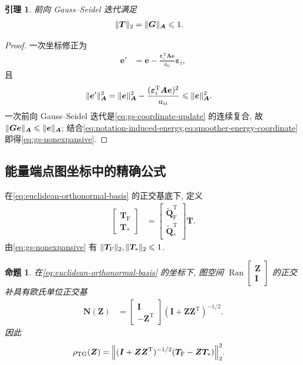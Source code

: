 \documentclass{ctexart}
\newcommand{\T}{\mathrm{T}}
\newcommand{\ti}[1]{\widetilde{#1}}
\newcommand{\eps}{\varepsilon}
\renewcommand{\le}{\leqslant}
\DeclareMathOperator{\Ran}{Ran}
\DeclarePairedDelimiter\norm{\lVert}{\rVert}
\newtheorem{lemma}[theorem]{引理}
\newtheorem{proposition}[theorem]{命题}
\begin{document}
\begin{lemma}
\label{lem:gs-nonexpansive}
前向 Gauss--Seidel 迭代满足
\begin{align}
    \norm{\bm T}_2&=\norm{\bm G}_{\bm A}\le 1.
    \label{eq:gs-nonexpansive}
\end{align}
\end{lemma}

\begin{proof}
一次坐标修正为
\begin{align}
    \bm e'&=\bm e-\frac{\bm\eps_i^\T\bm A\bm e}{a_{ii}}\bm\eps_i,
    \label{eq:gs-coordinate-update}
\end{align}
且
\begin{align}
    \norm{\bm e'}_{\bm A}^2&=\norm{\bm e}_{\bm A}^2-\frac{(\bm\eps_i^\T\bm A\bm e)^2}{a_{ii}}\le\norm{\bm e}_{\bm A}^2.
    \label{eq:gs-coordinate-energy}
\end{align}
一次前向 Gauss--Seidel 迭代是\cref{eq:gs-coordinate-update} 的连续复合, 故 $\norm{\bm G\bm e}_{\bm A}\le\norm{\bm e}_{\bm A}$; 结合\cref{eq:notation-induced-energy,eq:smoother-energy-coordinate} 即得\cref{eq:gs-nonexpansive}.
\end{proof}

\subsection{能量端点图坐标中的精确公式}
\label{subsec:graph-projector-stability}

在\cref{eq:euclidean-orthonormal-basis} 的正交基底下, 定义
\begin{align}
    \begin{bmatrix}
        \bm T_{\mathrm F}\\
        \bm T_\ast
    \end{bmatrix}
    &=\begin{bmatrix}
        \ti{\bm Q}_{\mathrm F}^\T\\
        \ti{\bm Q}_{\ast}^\T
    \end{bmatrix}\bm T.
    \label{eq:T-block-coordinates}
\end{align}
由\cref{eq:gs-nonexpansive} 有 $\norm{\bm T_{\mathrm F}}_2,\norm{\bm T_\ast}_2\le1$.

\begin{proposition}
\label{prop:graph-projector}
在\cref{eq:euclidean-orthonormal-basis} 的坐标下, 图空间 $\Ran\begin{bmatrix}\bm Z\\\bm I\end{bmatrix}$ 的正交补具有欧氏单位正交基
\begin{align}
    \bm N(\bm Z)&=\begin{bmatrix}
        \bm I\\
        -\bm Z^\T
    \end{bmatrix}(\bm I+\bm Z\bm Z^\T)^{-1/2}.
    \label{eq:graph-complement-basis}
\end{align}
因此
\begin{align}
    \rho_{\mathrm{TG}}(\bm Z)&=\norm*{(\bm I+\bm Z\bm Z^\T)^{-1/2}
    (\bm T_{\mathrm F}-\bm Z\bm T_\ast)}_2^2.
    \label{eq:tg-objective-graph}
\end{align}
\end{proposition}
\end{document}
